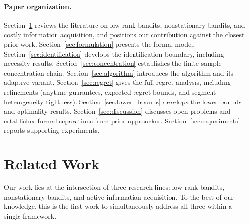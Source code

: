 \documentclass[11pt]{article}
\begin{document}
\paragraph{Paper organization.}
Section~\ref{sec:related} reviews the literature on low-rank bandits,
nonstationary bandits, and costly information acquisition, and positions our
contribution against the closest prior work.
Section~\ref{sec:formulation} presents the formal model.
Section~\ref{sec:identification} develops the identification boundary, including
necessity results.
Section~\ref{sec:concentration} establishes the finite-sample concentration chain.
Section~\ref{sec:algorithm} introduces the algorithm and its adaptive variant.
Section~\ref{sec:regret} gives the full regret analysis, including refinements
(anytime guarantees, expected-regret bounds, and segment-heterogeneity
tightness).
Section~\ref{sec:lower_bounds} develops the lower bounds and optimality results.
Section~\ref{sec:discussion} discusses open problems and establishes formal separations
from prior approaches.
Section~\ref{sec:experiments} reports supporting experiments.

\section{Related Work}
\label{sec:related}

Our work lies at the intersection of three research lines: low-rank bandits,
nonstationary bandits, and active information acquisition.
To the best of our knowledge, this is the first work to simultaneously address
all three within a single framework.
\end{document}
